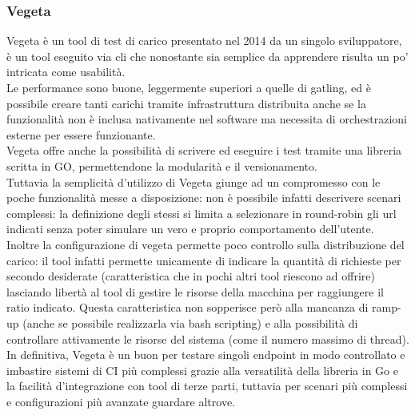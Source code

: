 \subsubsection{Vegeta}
Vegeta è un tool di test di carico presentato nel 2014 da un singolo sviluppatore, è un tool eseguito via \gls{cli} che nonostante sia semplice da apprendere risulta un po' intricata come usabilità. \\
Le performance sono buone, leggermente superiori a quelle di gatling, ed è possibile creare tanti carichi tramite infrastruttura distribuita anche se la funzionalità non è inclusa nativamente nel software ma necessita di orchestrazioni esterne per essere funzionante. \\
Vegeta offre anche la possibilità di scrivere ed eseguire i test tramite una libreria scritta in GO, permettendone la modularità e il versionamento. \\
Tuttavia la semplicità d’utilizzo di Vegeta giunge ad un compromesso con le poche funzionalità messe a disposizione: non è possibile infatti descrivere scenari complessi: la definizione degli stessi si limita a selezionare in round-robin gli url indicati senza poter simulare un vero e proprio comportamento dell'utente. \\
Inoltre la configurazione di vegeta permette poco controllo sulla distribuzione del carico: il tool infatti permette unicamente di indicare la quantità di richieste per secondo desiderate (caratteristica che in pochi altri tool riescono ad offrire) lasciando libertà al tool di gestire le risorse della macchina per raggiungere il ratio indicato. Questa caratteristica non sopperisce però alla mancanza di ramp-up (anche se possibile realizzarla via bash scripting) e alla possibilità di controllare attivamente le risorse del sistema (come il numero massimo di thread). \\
In definitiva, Vegeta è un buon per testare singoli endpoint in modo controllato e imbastire sistemi di CI più complessi grazie alla versatilità della libreria in Go e la facilità d’integrazione con tool di terze parti, tuttavia per scenari più complessi e configurazioni più avanzate guardare altrove.
